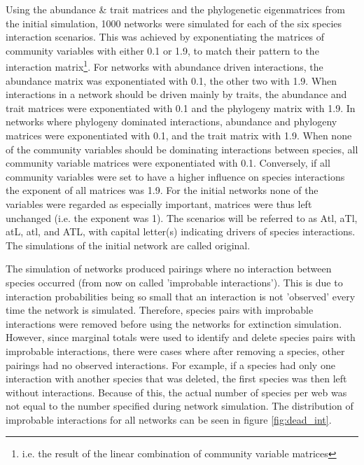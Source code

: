 \documentclass[12pt,a4paper]{article}
\begin{document}
	Using the abundance \& trait matrices and the phylogenetic eigenmatrices from the initial simulation, 1000 networks were simulated for each of the six species interaction scenarios. This was achieved by exponentiating the matrices of community variables with either 0.1 or 1.9, to match their pattern to the interaction matrix\footnote{i.e. the result of the linear combination of community variable matrices}. For networks with abundance driven interactions, the abundance matrix was exponentiated with 0.1, the other two with 1.9. When interactions in a network should be driven mainly by traits, the abundance and trait matrices were exponentiated with 0.1 and the phylogeny matrix with 1.9. In networks where phylogeny dominated interactions, abundance and phylogeny matrices were exponentiated with 0.1, and the trait matrix with 1.9. When none of the community variables should be dominating interactions between species, all community variable matrices were exponentiated with 0.1. Conversely, if all community variables were set to have a higher influence on species interactions the exponent of all matrices was 1.9. For the initial networks none of the variables were regarded as especially important, matrices were thus left unchanged (i.e. the exponent was 1). The scenarios will be referred to as Atl, aTl, atL, atl, and ATL, with capital letter(s) indicating drivers of species interactions. The simulations of the initial network are called original.\par
	
	 The simulation of networks produced pairings where no interaction between species occurred (from now on called 'improbable interactions'). This is due to interaction probabilities being so small that an interaction is not 'observed' every time the network is simulated. Therefore, species pairs with improbable interactions were removed before using the networks for extinction simulation. However, since marginal totals were used to identify and delete species pairs with improbable interactions, there were cases where after removing a species, other pairings had no observed interactions. For example, if a species had only one interaction with another species that was deleted, the first species was then left without interactions. Because of this, the actual number of species per web was not equal to the number specified during network simulation. The distribution of improbable interactions for all networks can be seen in figure \ref{fig:dead_int}.
\end{document}
